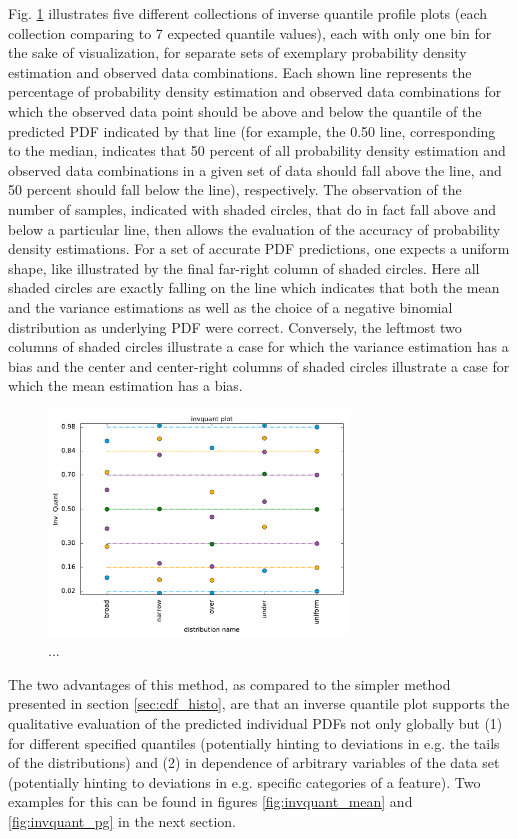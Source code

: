 \documentclass[BCOR=1mm, DIV=calc,10pt,
twoside=true,
twocolumn,
headings=normal]{scrartcl}
\newcommand{\fig}{Fig. }
\begin{document}
\fig \ref{fig:invquant_profiles} illustrates five different collections of inverse quantile profile plots (each collection comparing to 7 expected quantile values), each with only one bin for the sake of visualization, for separate sets of exemplary probability density estimation and observed data combinations. Each shown line represents the percentage of probability density estimation and observed data combinations for which the observed data point should be above and below the quantile of the predicted PDF indicated by that line (for example, the 0.50 line, corresponding to the median, indicates that 50 percent of all probability density estimation and observed data combinations in a given set of data should fall above the line, and 50 percent should fall below the line), respectively. The observation of the number of samples, indicated with shaded circles, that do in fact fall above and below a particular line, then allows the evaluation of the accuracy of probability density estimations. For a set of accurate PDF predictions, one expects a uniform shape, like illustrated by the final far-right column of shaded circles. Here all shaded circles are exactly falling on the line which indicates that both the mean and the variance estimations as well as the choice of a negative binomial distribution as underlying PDF were correct. Conversely, the leftmost two columns of shaded circles illustrate a case for which the variance estimation has a bias and the center and center-right columns of shaded circles illustrate a case for which the mean estimation has a bias.

\begin{figure}
\begin{center}
\includegraphics[width=8cm]{../figures/invquant_profiles}
\caption{\label{fig:invquant_profiles} ...}
\end{center}
\end{figure}

The two advantages of this method, as compared to the simpler method presented in section \ref{sec:cdf_histo}, are that an inverse quantile plot supports the qualitative evaluation of the predicted individual PDFs not only globally but (1) for different specified quantiles (potentially hinting to deviations in e.g. the tails of the distributions) and (2) in dependence of arbitrary variables of the data set (potentially hinting to deviations in e.g. specific categories of a feature). Two examples for this can be found in figures \ref{fig:invquant_mean} and \ref{fig:invquant_pg} in the next section.
\end{document}

